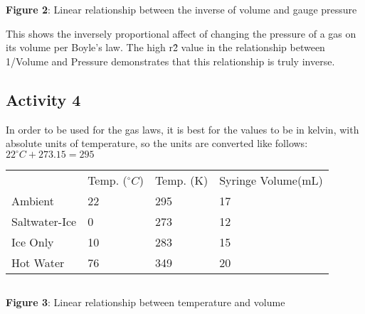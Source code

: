 \documentclass{article}
\begin{document}
\textbf{Figure 2}: Linear relationship between the inverse of volume and gauge pressure

This shows the inversely proportional affect of changing the pressure of a gas on its volume per Boyle's law. The high r\^2 value in the relationship between 1/Volume and Pressure demonstrates that this relationship is truly inverse.
\subsection{Activity 4}
In order to be used for the gas laws, it is best for the values to be in kelvin, with absolute units of temperature, so the units are converted like follows: $22^\circ C+273.15 = 295$


\centering
\begin{minipage}{0.4\textwidth}
\begin{table}[H]
    \begin{tabularx}{400pt}{p{1.7cm}|p{1cm}|p{1cm}|p{1cm}|} &Temp. ($^\circ C$) &Temp. (K)& Syringe Volume(mL) \\ \cline{1-4}
    Ambient&22&295&17\\
    Saltwater-Ice&0&273&12\\
    Ice Only&10&283&15\\
    Hot Water&76&349&20\\
    
    \end{tabularx}
\end{table}
\end{minipage}
\hfill
\begin{minipage}{0.5\textwidth}

\end{minipage}


$\ $

\textbf{Figure 3}: Linear relationship between temperature and volume
\end{document}
